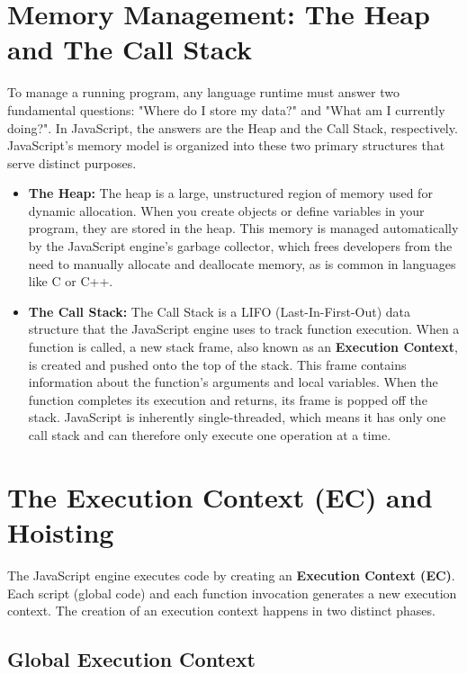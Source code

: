 \documentclass{scrbook}
\begin{document}
\section{Memory Management: The Heap and The Call Stack}

To manage a running program, any language runtime must answer two fundamental questions: "Where do I store my data?" and "What am I currently doing?". In JavaScript, the answers are the Heap and the Call Stack, respectively. JavaScript's memory model is organized into these two primary structures that serve distinct purposes.

\begin{itemize}
    \item
    \textbf{The Heap:} The heap is a large, unstructured region of memory used for dynamic allocation. When you create objects or define variables in your program, they are stored in the heap. This memory is managed automatically by the JavaScript engine's garbage collector, which frees developers from the need to manually allocate and deallocate memory, as is common in languages like C or C++.
    
    \item
    \textbf{The Call Stack:} The Call Stack is a LIFO (Last-In-First-Out) data structure that the JavaScript engine uses to track function execution. When a function is called, a new stack frame, also known as an \textbf{Execution Context}, is created and pushed onto the top of the stack. This frame contains information about the function's arguments and local variables. When the function completes its execution and returns, its frame is popped off the stack. JavaScript is inherently single-threaded, which means it has only one call stack and can therefore only execute one operation at a time.
\end{itemize}

\section{The Execution Context (EC) and Hoisting}

The JavaScript engine executes code by creating an \textbf{Execution Context (EC)}. Each script (global code) and each function invocation generates a new execution context. The creation of an execution context happens in two distinct phases.

\subsection{Global Execution Context}
\end{document}
